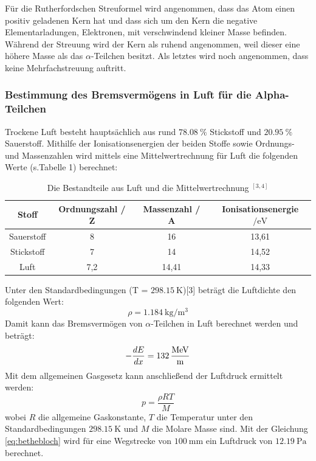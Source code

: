 \documentclass{article}
\begin{document}
Für die Rutherfordschen Streuformel wird angenommen, dass das Atom einen positiv geladenen Kern hat und dass sich um den Kern die negative Elementarladungen, Elektronen, mit verschwindend kleiner Masse befinden. Während der Streuung wird der Kern als ruhend angenommen, weil dieser eine höhere Masse als das $\alpha$-Teilchen besitzt. Als letztes wird noch angenommen, dass keine Mehrfachstreuung auftritt.

\subsubsection{Bestimmung des Bremsvermögens in Luft für die Alpha-Teilchen}
Trockene Luft besteht hauptsächlich aus rund $\SI{78,08}{\percent}$ Stickstoff und $\SI{20,95}{\percent}$ Sauerstoff. Mithilfe der Ionisationsenergien der beiden Stoffe sowie Ordnungs- und Massenzahlen wird mittels eine Mittelwertrechnung für Luft die folgenden Werte 
(s.Tabelle 1) berechnet:

\begin{table}[htpb]
	\centering
	\caption{Die Bestandteile aus Luft und die Mittelwertrechnung $^{[3,4]}$} 
	\begin{tabular}{c|c|c|c}
		
		Stoff	&	Ordnungszahl / Z &	Massenzahl / A &  Ionisationsenergie $/ \si{\electronvolt}$\\
		\hline
		Sauerstoff & 	8 & 16 & 13,61 \\
		Stickstoff &	7 & 14 & 14,52 \\
		Luft & 	7,2 & 14,41 & 14,33 \\
		
	\end{tabular}
\end{table}

Unter den Standardbedingungen (T = $\SI{298,15}{\kelvin}$)[3] beträgt die Luftdichte den folgenden Wert:
\begin{equation}
\rho = \SI{1,184}{\kilogram\per\cubic\meter}
\end{equation}
Damit kann das Bremsvermögen von $\alpha$-Teilchen in Luft berechnet werden und beträgt:
\begin{equation*}
-\frac{dE}{dx} = \SI{132}{\frac{\mega\electronvolt}{\meter}}
\end{equation*}
Mit dem allgemeinen Gasgesetz kann anschließend der Luftdruck ermittelt werden:
\begin{equation}
p = \frac{\rho R T}{M}
\end{equation}
wobei $R$ die allgemeine Gaskonstante, $T$ die Temperatur unter den Standardbedingungen $\SI{298,15}{\kelvin}$ und $M$ die Molare Masse sind. Mit der Gleichung \ref{eq:bethebloch} wird für eine Wegstrecke von $\SI{100}{\milli\meter}$ ein Luftdruck von $\SI{12,19}{\pascal}$ berechnet.
\end{document}
